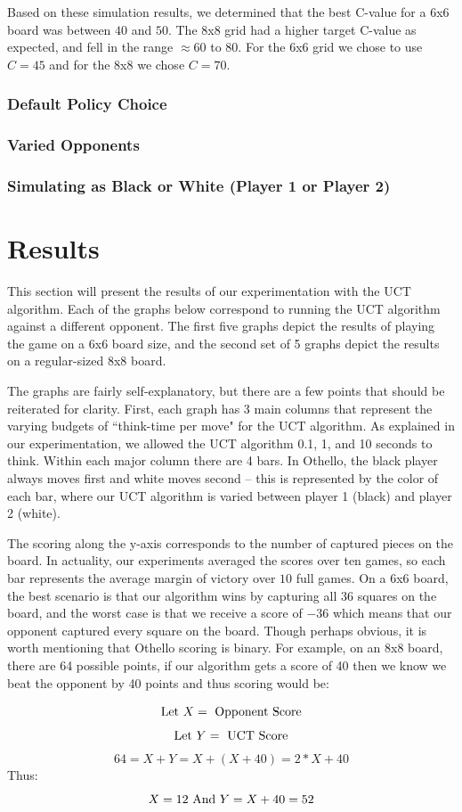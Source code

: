 \documentclass[12pt,letterpaper]{article}
\begin{document}
Based on these simulation results, we determined that the best C-value for a 6x6 board was between $40$ and $50$.  The 8x8 grid had a higher target C-value as expected, and fell in the range $\approx60$ to $80$.  For the 6x6 grid we chose to use $C=45$ and for the 8x8 we chose $C=70$.

\subsubsection{Default Policy Choice}

\subsubsection{Varied Opponents}

\subsubsection{Simulating as Black or White (Player 1 or Player 2)}


\section{Results}
\label{results}

This section will present the results of our experimentation with the UCT algorithm. Each of the graphs below correspond to running the UCT algorithm against a different opponent.  The first five graphs depict the results of playing the game on a 6x6 board size, and the second set of 5 graphs depict the results on a regular-sized 8x8 board.

The graphs are fairly self-explanatory, but there are a few points that should be reiterated for clarity.  First, each graph has 3 main columns that represent the varying budgets of ``think-time per move" for the UCT algorithm.  As explained in our experimentation, we allowed the UCT algorithm 0.1, 1, and 10 seconds to think. Within each major column there are 4 bars.  In Othello, the black player always moves first and white moves second -- this is represented by the color of each bar, where our UCT algorithm is varied between player 1 (black) and player 2 (white). 

The scoring along the y-axis corresponds to the number of captured pieces on the board. In actuality, our experiments averaged the scores over ten games, so each bar represents the average margin of victory over $10$ full games. On a 6x6 board, the best scenario is that our algorithm wins by capturing all $36$ squares on the board, and the worst case is that we receive a score of $-36$ which means that our opponent captured every square on the board. Though perhaps obvious, it is worth mentioning that Othello scoring is binary. For example, on an 8x8 board, there are 64 possible points, if our algorithm gets a score of 40 then we know we beat the opponent by 40 points and thus scoring would be:
\begin{center}
$$\textnormal{Let } X = \textnormal{ Opponent Score} $$
$$\textnormal{Let } Y = \textnormal{ UCT Score} $$
$$ 64 = X+Y = X+(X+40) = 2*X + 40$$ 
Thus:
$$ X = 12 \textnormal{  And   } Y = X+40 = 52$$ 
\end{center}
\end{document}
